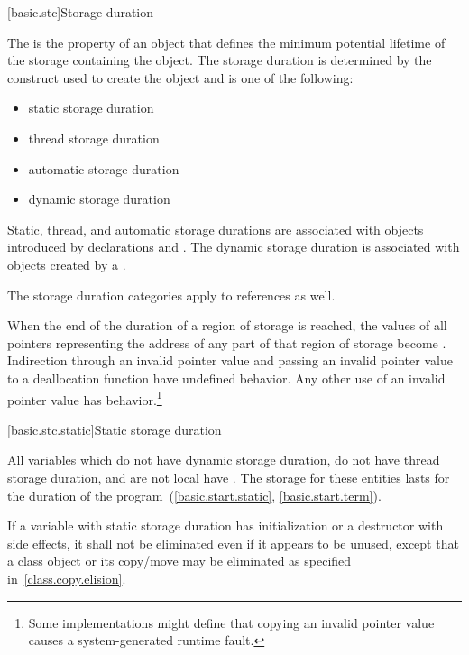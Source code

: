 [basic.stc]{Storage duration}

\pnum
{}%
The  is the property of an object that defines the minimum
potential lifetime of the storage containing the object. The storage
duration is determined by the construct used to create the object and is
one of the following:
\begin{itemize}
\item static storage duration
\item thread storage duration
\item automatic storage duration
\item dynamic storage duration
\end{itemize}

\pnum
{}%
%
%
%
Static, thread, and automatic storage durations are associated with objects
introduced by declarations and . The dynamic storage duration
is associated with objects created by a
.

\pnum
The storage duration categories apply to references as well.

\pnum
When the end of the duration of a region of storage is reached,
the values of all pointers
representing the address of any part of that region of storage
become .
Indirection through an invalid pointer value and
passing an invalid pointer value to a deallocation function
have undefined behavior.
Any other use of an invalid pointer value has
behavior.\footnote{Some implementations might define that
copying an invalid pointer value
causes a system-generated runtime fault.}

[basic.stc.static]{Static storage duration}

\pnum
{}%
All variables which do not have dynamic storage duration, do not have thread
storage duration, and are not local
have . The
storage for these entities lasts for the duration of the
program~(\ref{basic.start.static}, \ref{basic.start.term}).

\pnum
If a variable with static storage duration has initialization or a
destructor with side effects, it shall not be eliminated even if it
appears to be unused, except that a class object or its copy/move may be
eliminated as specified in~\ref{class.copy.elision}.

